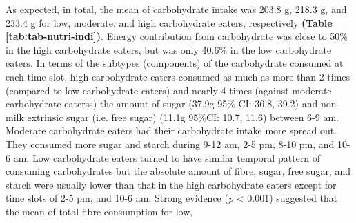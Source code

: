 As expected, in total, the mean of carbohydrate intake was 203.8 g, 218.3 g, and 233.4 g for low, moderate, and high carbohydrate eaters, respectively \textbf{(Table \ref{tab:tab-nutri-indi})}. Energy contribution from carbohydrate was close to 50\% in the high carbohydrate eaters, but was only 40.6\% in the low carbohydrate eaters. In terms of the subtypes (components) of the carbohydrate consumed at each time slot, high carbohydrate eaters consumed as much as more than 2 times (compared to low carbohydrate eaters) and nearly 4 times (against moderate carbohydrate eaterss) the amount of sugar (37.9g 95\% CI: 36.8, 39.2) and non-milk extrinsic sugar (i.e. free sugar) (11.1g 95\%CI: 10.7, 11.6) between 6-9 am. Moderate carbohydrate eaters had their carbohydrate intake more spread out. They consumed more sugar and starch during 9-12 am, 2-5 pm, 8-10 pm, and 10-6 am. Low carbohydrate eaters turned to have similar temporal pattern of consuming carbohydrates but the absolute amount of fibre, sugar, free sugar, and starch were usually lower than that in the high carbohydrate eaters except for time slots of 2-5 pm, and 10-6 am. Strong evidence (\textit{p} < 0.001) suggested that the mean of total fibre consumption for low,






